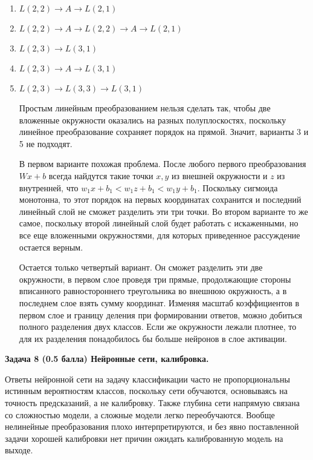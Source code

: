 \documentclass[10pt]{article}
\begin{document}
	
	\begin{enumerate}
		\item $L(2, 2)\to A\to L(2, 1)$
		\item $L(2, 2) \to A \to L(2, 2) \to A \to L(2, 1)$
		\item $L(2, 3) \to L(3, 1)$
		\item $L(2, 3) \to A \to L(3, 1)$
		\item $L(2, 3) \to L(3, 3) \to L(3, 1)$
		
		Простым линейным преобразованием нельзя сделать так, чтобы две вложенные окружности оказались на разных полуплоскостях, поскольку линейное преобразование сохраняет порядок на прямой. Значит, варианты 3 и 5 не подходят.
		
		В первом варианте похожая проблема. После любого первого преобразования $Wx + b$ всегда найдутся такие точки $x, y$ из внешней окружности и $z$ из внутренней, что $w_1 x + b_1 < w_1 z + b_1 < w_1 y + b_1$. Поскольку сигмоида монотонна, то этот порядок на первых координатах сохранится и последний линейный слой не сможет разделить эти три точки. Во втором варианте то же самое, поскольку второй линейный слой будет работать с искаженными, но все еще вложенными окружностями, для которых приведенное рассуждение остается верным.
		
		Остается только четвертый вариант. Он сможет разделить эти две окружности, в первом слое проведя три прямые,  продолжающие стороны вписанного равностороннего треугольника во внешнюю окружность, а в последнем слое взять сумму координат. Изменяя масштаб коэффициентов в первом слое и границу деления при формировании ответов, можно добиться полного разделения двух классов. Если же окружности лежали плотнее, то для их разделения понадобилось бы больше нейронов в слое активации.
	\end{enumerate}
	
	
	
	
	\bigskip
	\textbf{Задача 8 (0.5 балла) Нейронные сети, калибровка.}
	
	
	Ответы нейронной сети на задачу классификации часто не пропорциональны истинным вероятностям классов, поскольку сети обучаются, основываясь на точность предсказаний, а не калибровку. Также глубина сети напрямую связана со сложностью модели, а сложные модели легко переобучаются. Вообще нелинейные преобразования плохо интерпретируются, и без явно поставленной задачи хорошей калибровки нет причин ожидать калиброванную модель на выходе.
	
	
	\bigskip
	
	
	
	
\end{document}

